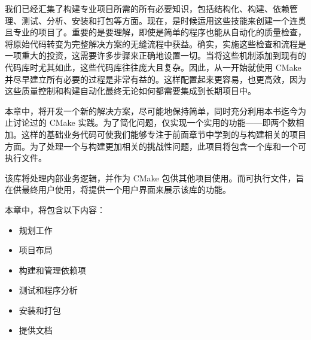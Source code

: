 我们已经汇集了构建专业项目所需的所有必要知识，包括结构化、构建、依赖管理、测试、分析、安装和打包等方面。现在，是时候运用这些技能来创建一个连贯且专业的项目了。重要的是要理解，即使是简单的程序也能从自动化的质量检查，将原始代码转变为完整解决方案的无缝流程中获益。确实，实施这些检查和流程是一项重大的投资，这需要许多步骤来正确地设置一切。当将这些机制添加到现有的代码库时尤其如此，这些代码库往往庞大且复杂。因此，从一开始就使用 CMake 并尽早建立所有必要的过程是非常有益的。这样配置起来更容易，也更高效，因为这些质量控制和构建自动化最终无论如何都需要集成到长期项目中。

本章中，将开发一个新的解决方案，尽可能地保持简单，同时充分利用本书迄今为止讨论过的 CMake 实践。为了简化问题，仅实现一个实用的功能——即两个数相加。这样的基础业务代码可使我们能够专注于前面章节中学到的与构建相关的项目方面。为了处理一个与构建更加相关的挑战性问题，此项目将包含一个库和一个可执行文件。

该库将处理内部业务逻辑，并作为 CMake 包供其他项目使用。而可执行文件，旨在供最终用户使用，将提供一个用户界面来展示该库的功能。

本章中，将包含以下内容：

\begin{itemize}
\item
规划工作

\item
项目布局

\item
构建和管理依赖项

\item
测试和程序分析

\item
安装和打包

\item
提供文档
\end{itemize}